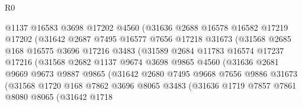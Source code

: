 \begin{lexlean}{R0}
\begin{coremodule}
                        @1137
                        @16583
                        @3698
                        @17202
                        @4560
                        (@31636
                          @2688
                          @16578
                          @16582
                          @17219
                          @17202
                          (@31642
                            @2687
                            @7495
                            @16577
                            @7656
                            @17218
                            @31673
                            (@31568
                              @2685
                              @168
                              @16575
                              @3696
                              @17216
                              @3483
                              (@31589
                                @2684
                                @11783
                                @16574
                                @17237
                                @17216
                                (@31568
                                  @2682
                                  @1137
                                  @9674
                                  @3698
                                  @9865
                                  @4560
                                  (@31636
                                    @2681
                                    @9669
                                    @9673
                                    @9887
                                    @9865
                                    (@31642
                                      @2680
                                      @7495
                                      @9668
                                      @7656
                                      @9886
                                      @31673
                                      (@31568
                                        @1720
                                        @168
                                        @7862
                                        @3696
                                        @8065
                                        @3483
                                        (@31636
                                          @1719
                                          @7857
                                          @7861
                                          @8080
                                          @8065
                                          (@31642
                                            @1718

\end{coremodule}
\end{lexlean}
